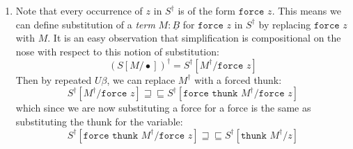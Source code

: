 \documentclass[acmsmall,screen,12pt]{acmart}
\renewcommand{\u}{\underline}
\newcommand{\ltdyn}{\sqsubseteq}
\newcommand{\gtdyn}{\sqsupseteq}
\newcommand{\equidyn}{\mathrel{\gtdyn\ltdyn}}
\newcommand{\simp}[1]{{#1}^{\dag}}
\newcommand{\simpp}[1]{\simp{({#1})}}
\newcommand{\bindXtoYinZ}[2]{\kw{bind}#2 \leftarrow #1;}
\newcommand{\kw}[1]{\texttt{#1}\,\,}
\newcommand{\ret}{\kw{ret}}
\newcommand{\thunk}{\kw{thunk}}
\newcommand{\force}{\kw{force}}
\begin{document}
{\begin{longonly}
\begin{longproof}
\begin{enumerate}
  Then we can lift the definition of the thunk to the top-level by $\u F\beta$:
  \[ \simp{E}[\force\thunk\simp V/\ret x] \equidyn
  \bindXtoYinZ \ret\thunk \simp V w \simp{E}[\force w/\ret x]
  \]
  Then because $\simp V$ is thunkable, we can bind it at the top-level
  and reduce an administrative redex away to get our desired result:
  \begin{align*}
    &\bindXtoYinZ \ret\thunk \simp V w \simp{E}[\force w/\ret x]\\
    &\equidyn \bindXtoYinZ {\simp V} x \bindXtoYinZ {\ret\thunk\ret x} w \simp{E}[\force w/\ret x]\tag{$V$ thunkable}\\
    &\equidyn \bindXtoYinZ {\simp V} x \simp{E}[\force \thunk\ret x/\ret x]\tag{$\u F\beta$}\\
    &\equidyn \bindXtoYinZ {\simp V} x \simp{E}[\ret x/\ret x]\tag{$U\beta$}\\
    &\equidyn \bindXtoYinZ {\simp V} x \simp{E}\\
  \end{align*}
  \item Note that every occurrence of $z$ in $\simp S$ is of the form
    $\force z$. This means we can define substitution of a \emph{term}
    $M : \u B$ for $\force z$ in $\simp S$ by replacing $\force z$
    with $M$.  It is an easy observation that simplification is
    compositional on the nose with respect to this notion of
    substitution:
    \[ \simpp{S[M/\bullet]} = \simp S[\simp M/\force z] \]
    Then by repeated $U\beta$, we can replace $\simp M$ with a forced thunk:
    \[ \simp S[\simp M/\force z] \equidyn \simp S[\force\thunk \simp M/\force z] \]
    which since we are now substituting a force for a force is the
    same as substituting the thunk for the variable:
    \[ \simp S[\force\thunk \simp M/\force z]
    \equidyn
    \simp S[\thunk \simp M / z]
    \]
  \end{enumerate}
\end{longproof}


\end{longonly}}
\end{document}
